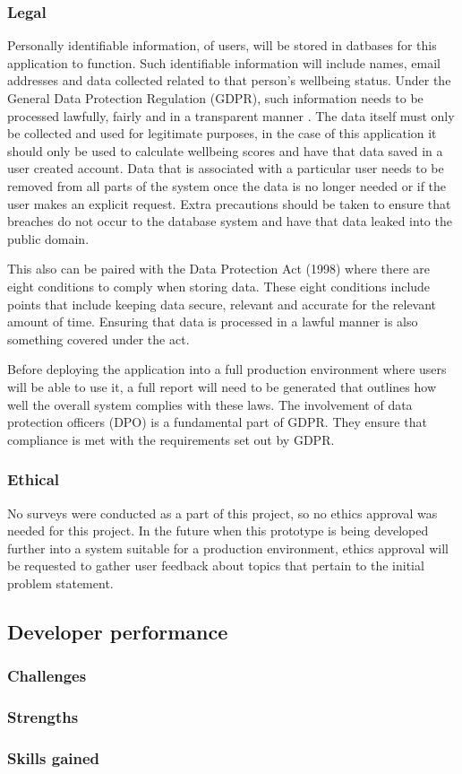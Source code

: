 \subsubsection{Legal}
Personally identifiable information, of users, will be stored in datbases for this application to function.
Such identifiable information will include names, email addresses and data collected related to that person's wellbeing status.
Under the General Data Protection Regulation (GDPR), such information needs to be processed lawfully, fairly and in a transparent manner \cite{unihighlands2018sevenprinciples}.
The data itself must only be collected and used for legitimate purposes, in the case of this application it should only be used to calculate wellbeing 
scores and have that data saved in a user created account.
Data that is associated with a particular user needs to be removed from all parts of the system once the data is no longer needed or if the user makes
an explicit request.
Extra precautions should be taken to ensure that breaches do not occur to the database system and have that data leaked into the public domain.

This also can be paired with the Data Protection Act (1998) where there are eight conditions to comply when storing data.
These eight conditions include points that include keeping data secure, relevant and accurate for the relevant amount of time. 
Ensuring that data is processed in a lawful manner is also something covered under the act.

Before deploying the application into a full production environment where users will be able to use it, a full report will need to be generated that
outlines how well the overall system complies with these laws.
The involvement of data protection officers (DPO) is a fundamental part of GDPR. 
They ensure that compliance is met with the requirements set out by GDPR.

\subsubsection{Ethical}
No surveys were conducted as a part of this project, so no ethics approval was needed for this project.
In the future when this prototype is being developed further into a system suitable for a production environment, ethics approval will be requested
to gather user feedback about topics that pertain to the initial problem statement.

\subsection{Developer performance}

\subsubsection{Challenges}

\subsubsection{Strengths}

\subsubsection{Skills gained}